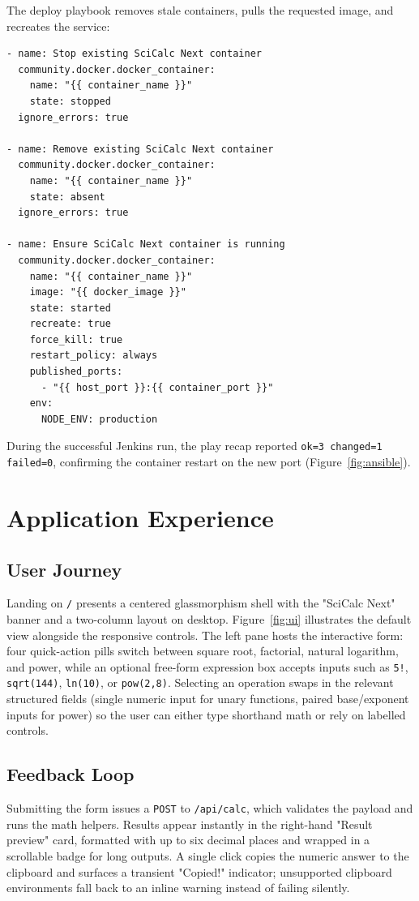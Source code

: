 \documentclass[12pt]{article}
\begin{document}
The deploy playbook removes stale containers, pulls the requested image, and recreates the service:
\begin{verbatim}
- name: Stop existing SciCalc Next container
  community.docker.docker_container:
    name: "{{ container_name }}"
    state: stopped
  ignore_errors: true

- name: Remove existing SciCalc Next container
  community.docker.docker_container:
    name: "{{ container_name }}"
    state: absent
  ignore_errors: true

- name: Ensure SciCalc Next container is running
  community.docker.docker_container:
    name: "{{ container_name }}"
    image: "{{ docker_image }}"
    state: started
    recreate: true
    force_kill: true
    restart_policy: always
    published_ports:
      - "{{ host_port }}:{{ container_port }}"
    env:
      NODE_ENV: production
\end{verbatim}
During the successful Jenkins run, the play recap reported \texttt{ok=3 changed=1 failed=0}, confirming the container restart on the new port (Figure~\ref{fig:ansible}).

\section{Application Experience}
\subsection*{User Journey}
Landing on \texttt{/} presents a centered glassmorphism shell with the "SciCalc Next" banner and a two-column layout on desktop. Figure~\ref{fig:ui} illustrates the default view alongside the responsive controls. The left pane hosts the interactive form: four quick-action pills switch between square root, factorial, natural logarithm, and power, while an optional free-form expression box accepts inputs such as \texttt{5!}, \texttt{sqrt(144)}, \texttt{ln(10)}, or \texttt{pow(2,8)}. Selecting an operation swaps in the relevant structured fields (single numeric input for unary functions, paired base/exponent inputs for power) so the user can either type shorthand math or rely on labelled controls.

\subsection*{Feedback Loop}
Submitting the form issues a \texttt{POST} to \texttt{/api/calc}, which validates the payload and runs the math helpers. Results appear instantly in the right-hand "Result preview" card, formatted with up to six decimal places and wrapped in a scrollable badge for long outputs. A single click copies the numeric answer to the clipboard and surfaces a transient "Copied!" indicator; unsupported clipboard environments fall back to an inline warning instead of failing silently.
\end{document}
